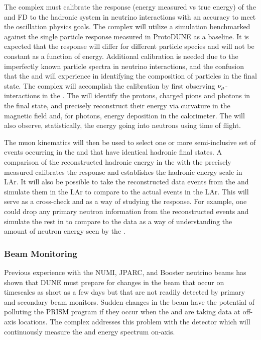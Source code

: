 The   complex must calibrate the response (energy measured vs true energy) of the \larnd and FD to the hadronic system in neutrino interactions with an accuracy %
to meet the oscillation physics goals. The complex will utilize a simulation benchmarked against the single particle response measured in ProtoDUNE as a baseline. It is expected that the response will differ for different particle species and will not be constant as a function of energy. Additional calibration is needed due to the imperfectly known particle spectra in neutrino interactions, and the confusion that the    and  will experience in identifying the composition of particles in the final state. The   complex will accomplish the calibration by first observing $\nu_\mu$- interactions in the . The  will identify the protons, charged pions and photons in the final state, %
and precisely reconstruct their energy via curvature in the magnetic field and, for photons, energy deposition in the calorimeter. %
The  will also observe, statistically, the energy going into neutrons using time of flight. %

The muon kinematics will then be used to select one or more semi-inclusive set of events occurring in the \larnd and  that have identical hadronic final states. A comparison of the reconstructed hadronic energy in the \larnd with the precisely measured  calibrates the response and establishes the hadronic energy scale in LAr. It will also be possible to take the reconstructed data events from the  and simulate them in the LAr to compare to the actual events in the LAr. This will serve as a cross-check and as a way of studying the response. For example, one could drop any primary neutron information from the  reconstructed events and simulate the rest in \larnd to compare to the \larnd data as a way of understanding the amount of neutron energy seen by the \larnd.

\subsubsection{Beam Monitoring}
Previous experience with the NUMI, JPARC, and Booster neutrino beams has shown that DUNE must prepare for changes in the beam that occur on timescales as short as a few days but that are not readily detected by primary and secondary beam monitors. Sudden changes in the beam have the potential of polluting the PRISM program if they occur when the \larnd and  are taking data at off-axis locations. The   complex addresses this problem with the  detector which will continuously measure the \numu and \anumu energy spectrum on-axis. 


